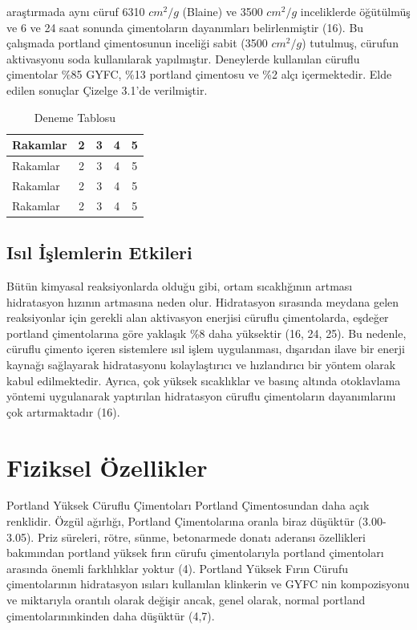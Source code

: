 \documentclass[12pt]{article}
\begin{document}
araştırmada aynı cüruf 6310 $cm^2/g$ (Blaine) ve 3500 $cm^2/g$ inceliklerde
öğütülmüş ve 6 ve 24 saat sonunda çimentoların dayanımları belirlenmiştir
(16). Bu çalışmada portland çimentosunun inceliği sabit (3500 $cm^2/g$)
tutulmuş, cürufun aktivasyonu soda kullanılarak yapılmıştır. Deneylerde
kullanılan cüruflu çimentolar \%85 GYFC, \%13 portland çimentosu ve \%2
alçı içermektedir. Elde edilen sonuçlar Çizelge 3.1’de verilmiştir.\\
\begin{table}
\center
\begin{tabular}{|l|c|c|c|c|}\hline
Rakamlar 	& 2 & 3	& 4	& 5 \\\hline 
Rakamlar	& 2 & 3	& 4	& 5 \\\hline 
Rakamlar 	& 2 & 3	& 4	& 5 \\\hline 
Rakamlar 	& 2 & 3	& 4	& 5 \\\hline 
\end{tabular}
\caption{Deneme Tablosu}

\end{table}

\subsection{Isıl İşlemlerin Etkileri}
Bütün kimyasal reaksiyonlarda olduğu gibi, ortam sıcaklığının artması
hidratasyon hızının artmasına neden olur. Hidratasyon sırasında meydana
gelen reaksiyonlar için gerekli alan aktivasyon enerjisi cüruflu çimentolarda,
eşdeğer portland çimentolarına göre yaklaşık \%8 daha yüksektir (16, 24,
25). Bu nedenle, cüruflu çimento içeren sistemlere ısıl işlem uygulanması,
dışarıdan ilave bir enerji kaynağı sağlayarak hidratasyonu kolaylaştırıcı ve
hızlandırıcı bir yöntem olarak kabul edilmektedir.
Ayrıca, çok yüksek sıcaklıklar ve basınç altında otoklavlama yöntemi
uygulanarak yaptırılan hidratasyon cüruflu çimentoların dayanımlarını çok
artırmaktadır (16).
\section{Fiziksel Özellikler}
Portland Yüksek Cüruflu Çimentoları Portland Çimentosundan daha açık
renklidir. Özgül ağırlığı, Portland Çimentolarına oranla biraz düşüktür (3.00-
3.05). Priz süreleri, rötre, sünme, betonarmede donatı aderansı özellikleri
bakımından portland yüksek fırın cürufu çimentolarıyla portland çimentoları
arasında önemli farklılıklar yoktur (4).
Portland Yüksek Fırın Cürufu çimentolarının hidratasyon ısıları kullanılan
klinkerin ve GYFC nin kompozisyonu ve miktarıyla orantılı olarak değişir
ancak, genel olarak, normal portland çimentolarınınkinden daha düşüktür
(4,7).
\end{document}
